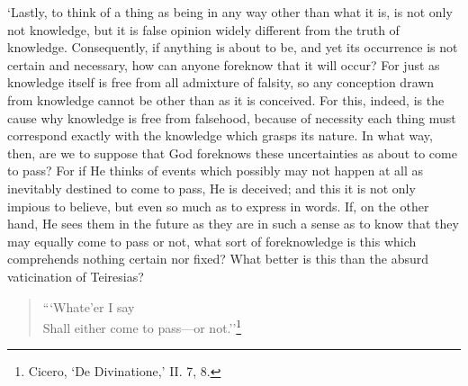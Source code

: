 \documentclass[11pt]{book}
\begin{document}
`Lastly, to think of a thing as being in any way other than what it is,
is not only not knowledge, but it is false opinion widely different from
the truth of knowledge. Consequently, if anything is about to be, and
yet its occurrence is not certain and necessary, how can anyone foreknow
that it will occur? For just as knowledge itself is free from all
admixture of falsity, so any conception drawn from knowledge cannot be
other than as it is conceived. For this, indeed, is the cause why
knowledge is free from falsehood, because of necessity each thing must
correspond exactly with the knowledge which \linebreak grasps its nature. In what
way, then, are we to suppose that God foreknows these uncertainties as
about to come to pass? For if He thinks of events which possibly may not
happen at all as inevitably destined to come to pass, He is deceived;
and this it is not only impious to believe, but even so much as to
express in words. If, on the other hand, He sees them in the future as
they are in such a sense as to know that they may equally come to pass
or not, what sort of foreknowledge is this which comprehends nothing
certain nor fixed? What better is this than the absurd vaticination of
Teiresias?

\begin{quote}
      ```Whate'er I say \\
    Shall either come to pass---or not.''\footnote{Cicero, ‘De Divinatione,’ II. 7, 8.}
\end{quote}
\end{document}
